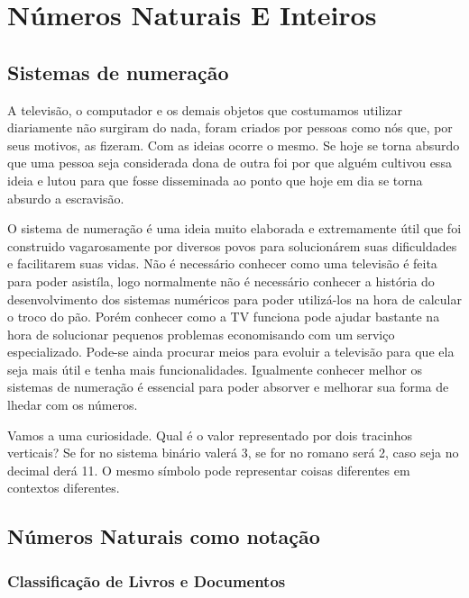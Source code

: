 \chapter{Números Naturais E Inteiros}


\section{Sistemas de numeração}

A televisão, o computador e os demais objetos que costumamos utilizar diariamente não surgiram do nada, foram criados por pessoas como nós que, por seus motivos, as fizeram. Com as ideias ocorre o mesmo. Se hoje se torna absurdo que uma pessoa seja considerada dona de outra foi por que alguém cultivou essa ideia e lutou para que fosse disseminada ao ponto que hoje em dia se torna absurdo a escravisão.

O sistema de numeração é uma ideia muito elaborada e extremamente útil que foi construido vagarosamente por diversos povos para solucionárem suas dificuldades e facilitarem suas vidas. Não é necessário conhecer como uma televisão é feita para poder asistíla, logo normalmente não é necessário conhecer a história do desenvolvimento dos sistemas numéricos para poder utilizá-los na hora de calcular o troco do pão. Porém conhecer como a TV funciona pode ajudar bastante na hora de solucionar pequenos problemas economisando com um serviço especializado. Pode-se ainda procurar meios para evoluir a televisão para que ela seja mais útil e tenha mais funcionalidades. Igualmente conhecer melhor os sistemas de numeração é essencial para poder absorver e melhorar sua forma de lhedar com os números.

Vamos a uma curiosidade. Qual é o valor representado por dois tracinhos verticais? Se for no sistema binário valerá 3, se for no romano será 2, caso seja no decimal derá 11. O mesmo símbolo pode representar coisas diferentes em contextos diferentes.





\section{Números Naturais como notação}
\subsection{Classificação de Livros e Documentos}

